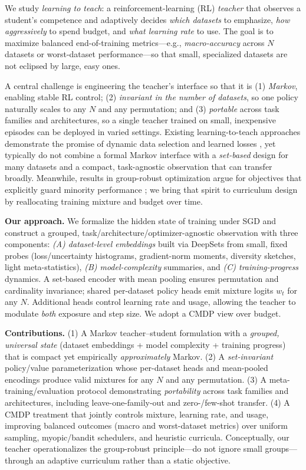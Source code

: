 \documentclass[11pt]{article}
\newcommand{\1}{\mathbf{1}}
\begin{document}
We study \emph{learning to teach}: a reinforcement-learning (RL) \emph{teacher} that observes a student’s competence and adaptively decides \emph{which datasets} to emphasize, \emph{how aggressively} to spend budget, and \emph{what learning rate} to use. The goal is to maximize balanced end-of-training metrics—e.g., \emph{macro-accuracy} across $N$ datasets or worst-dataset performance—so that small, specialized datasets are not eclipsed by large, easy ones. 

A central challenge is engineering the teacher’s interface so that it is (1) \emph{Markov}, enabling stable RL control; (2) \emph{invariant in the number of datasets}, so one policy naturally scales to any $N$ and any permutation; and (3) \emph{portable} across task families and architectures, so a single teacher trained on small, inexpensive episodes can be deployed in varied settings. Existing learning-to-teach approaches demonstrate the promise of dynamic data selection and learned losses \citep{fan2018l2t,wu2018l2tloss}, yet typically do not combine a formal Markov interface with a \emph{set-based} design for many datasets and a compact, task-agnostic observation that can transfer broadly. Meanwhile, results in group-robust optimization argue for objectives that explicitly guard minority performance \citep{hashimoto2018fairness,sagawa2020dro}; we bring that spirit to curriculum design by reallocating training mixture and budget over time.

\textbf{Our approach.} We formalize the hidden state of training under SGD and construct a grouped, task/architecture/optimizer-agnostic observation with three components: \emph{(A) dataset-level embeddings} built via DeepSets from small, fixed probes (loss/uncertainty histograms, gradient-norm moments, diversity sketches, light meta-statistics), \emph{(B) model-complexity} summaries, and \emph{(C) training-progress} dynamics. A set-based encoder with mean pooling ensures permutation and cardinality invariance; shared per-dataset policy heads emit mixture logits $w_t$ for any $N$. Additional heads control learning rate and usage, allowing the teacher to modulate \emph{both} exposure and step size. We adopt a CMDP view over budget. 

\textbf{Contributions.} (1) A Markov teacher--student formulation with a \emph{grouped, universal state} (dataset embeddings + model complexity + training progress) that is compact yet empirically \emph{approximately} Markov. (2) A \emph{set-invariant} policy/value parameterization whose per-dataset heads and mean-pooled encodings produce valid mixtures for any $N$ and any permutation. (3) A meta-training/evaluation protocol demonstrating \emph{portability} across task families and architectures, including leave-one-family-out and zero-/few-shot transfer. (4) A CMDP treatment that jointly controls mixture, learning rate, and usage, improving balanced outcomes (macro and worst-dataset metrics) over uniform sampling, myopic/bandit schedulers, and heuristic curricula. Conceptually, our teacher operationalizes the group-robust principle—do not ignore small groups—through an adaptive curriculum rather than a static objective.
\end{document}
